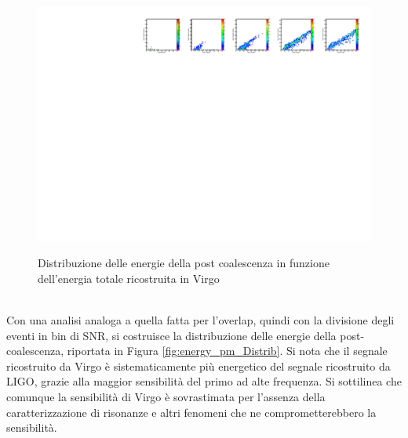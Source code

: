 \begin{figure}[ht]
	{\includegraphics[width=1.\textwidth]{figures/Capitolo_3/report/EnergyDistributionFactorDetector3APR4_q091.pdf}}\vspace{-8pt}
	\caption{Distribuzione delle energie della post coalescenza in funzione dell'energia totale ricostruita in Virgo}
	\label{fig:energy_pm_colz}
\end{figure}\\
Con una analisi analoga a quella fatta per l'overlap, quindi con la divisione degli eventi in bin di SNR, si costruisce la distribuzione delle energie della post-coalescenza, riportata in Figura \ref{fig:energy_pm_Distrib}. Si nota che il segnale ricostruito da Virgo è sistematicamente più energetico del segnale ricostruito da LIGO, grazie alla maggior sensibilità del primo ad alte frequenza. Si sottilinea che comunque la sensibilità di Virgo è sovrastimata per l'assenza della caratterizzazione di risonanze e altri fenomeni che ne comprometterebbero la sensibilità.
